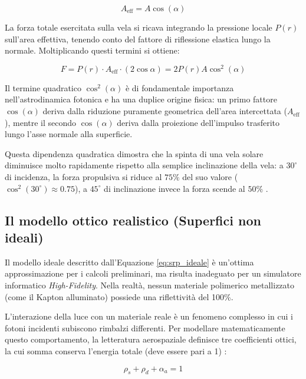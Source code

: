 \begin{equation}
    A_{\text{eff}} = A\cos(\alpha)
\end{equation}

La forza totale esercitata sulla vela si ricava integrando la pressione locale $P(r)$ sull'area effettiva, tenendo conto del fattore di riflessione elastica lungo la normale. Moltiplicando questi termini si ottiene:

\begin{equation}
    F = P(r) \cdot A_{\text{eff}} \cdot (2\cos\alpha) = 2P(r)A\cos^2(\alpha)
\end{equation}

Il termine quadratico $\cos^2(\alpha)$ è di fondamentale importanza nell'astrodinamica fotonica e ha una duplice origine fisica: un primo fattore $\cos(\alpha)$ deriva dalla riduzione puramente geometrica dell'area intercettata ($A_{\text{eff}}$), mentre il secondo $\cos(\alpha)$ deriva dalla proiezione dell'impulso trasferito lungo l'asse normale alla superficie.

Questa dipendenza quadratica dimostra che la spinta di una vela solare diminuisce molto rapidamente rispetto alla semplice inclinazione della vela: a $30^\circ$ di incidenza, la forza propulsiva si riduce al $75\%$ del suo valore ($\cos^2(30^\circ) \approx 0.75$), a $45^\circ$ di inclinazione invece la forza scende al $50\%$ \cite{mcinnes1999solar}.


\subsection{Il modello ottico realistico (Superfici non ideali)}
Il modello ideale descritto dall'Equazione \ref{eq:srp_ideale} è un'ottima approssimazione per i calcoli preliminari, ma risulta inadeguato per un simulatore informatico \textit{High-Fidelity}. Nella realtà, nessun materiale polimerico metallizzato (come il Kapton alluminato) possiede una riflettività del 100\%. 

L'interazione della luce con un materiale reale è un fenomeno complesso in cui i fotoni incidenti subiscono rimbalzi differenti. Per modellare matematicamente questo comportamento, la letteratura aerospaziale definisce tre coefficienti ottici, la cui somma conserva l'energia totale (deve essere pari a 1) \cite{mcinnes1999solar}:

\begin{equation}
    \rho_s + \rho_d + \alpha_a = 1
\end{equation}

